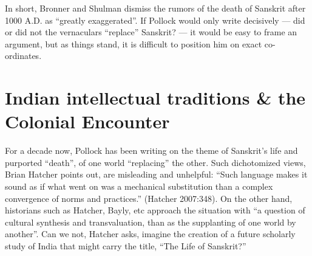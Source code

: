 In short, Bronner and Shulman dismiss the rumors of the death of Sanskrit after 1000 A.D. as “greatly exaggerated”. If Pollock would only write decisively — did or did not the vernaculars “replace” Sanskrit? — it would be easy to frame an argument, but as things stand, it is difficult to position him on exact co-ordinates. 

\section{Indian intellectual traditions \& the Colonial Encounter}%

For a decade now, Pollock has been writing on the theme of Sanskrit’s life and purported “death”, of one world “replacing” the other. Such dichotomized views, Brian Hatcher points out, are misleading and unhelpful: “Such language makes it sound as if what went on was a mechanical substitution than a complex convergence of norms and practices.” (Hatcher 2007:348). On the other hand, historians such as Hatcher, Bayly, etc approach the situation with “a question of cultural synthesis and transvaluation, than as the supplanting of one world by another”. Can we not, Hatcher asks, imagine the creation of a future scholarly study of India that might carry the title, “The Life of Sanskrit?”  

